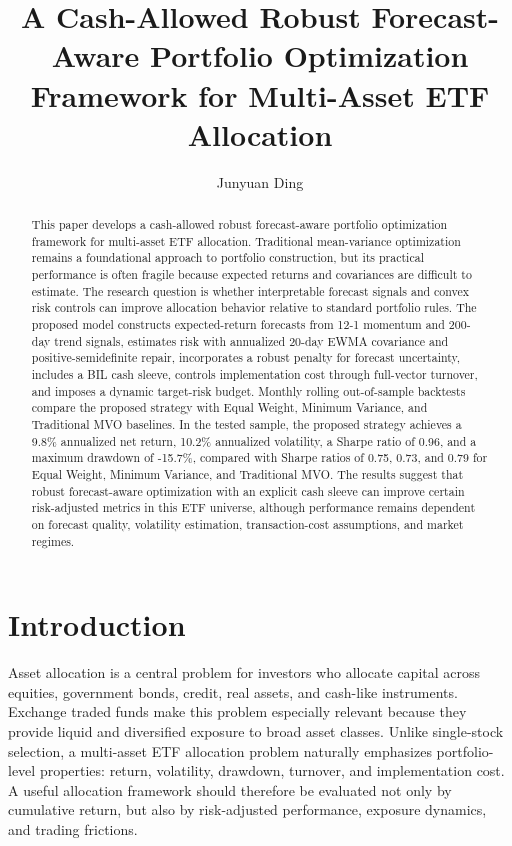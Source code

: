 \documentclass[11pt]{article}
\title{A Cash-Allowed Robust Forecast-Aware Portfolio Optimization Framework for Multi-Asset ETF Allocation}
\author{Junyuan Ding}
\date{}
\begin{document}
\maketitle

\begin{abstract}
This paper develops a cash-allowed robust forecast-aware portfolio optimization
framework for multi-asset ETF allocation. Traditional mean-variance optimization
remains a foundational approach to portfolio construction, but its practical
performance is often fragile because expected returns and covariances are difficult
to estimate. The research question is whether interpretable forecast signals and
convex risk controls can improve allocation behavior relative to standard portfolio
rules. The proposed model constructs expected-return forecasts from 12-1 momentum
and 200-day trend signals, estimates risk with annualized 20-day EWMA covariance
and positive-semidefinite repair, incorporates a robust penalty for forecast
uncertainty, includes a BIL cash sleeve, controls implementation cost through
full-vector turnover, and imposes a dynamic target-risk budget. Monthly rolling
out-of-sample backtests compare the proposed strategy with Equal Weight, Minimum
Variance, and Traditional MVO baselines. In the tested sample, the proposed strategy
achieves a 9.8\% annualized net return, 10.2\% annualized volatility, a Sharpe ratio
of 0.96, and a maximum drawdown of -15.7\%, compared with Sharpe ratios of 0.75,
0.73, and 0.79 for Equal Weight, Minimum Variance, and Traditional MVO. The results
suggest that robust forecast-aware optimization with an explicit cash sleeve can
improve certain risk-adjusted metrics in this ETF universe, although performance
remains dependent on forecast quality, volatility estimation, transaction-cost
assumptions, and market regimes.
\end{abstract}

\section{Introduction}

Asset allocation is a central problem for investors who allocate capital across
equities, government bonds, credit, real assets, and cash-like instruments. Exchange
traded funds make this problem especially relevant because they provide liquid and
diversified exposure to broad asset classes. Unlike single-stock selection, a
multi-asset ETF allocation problem naturally emphasizes portfolio-level properties:
return, volatility, drawdown, turnover, and implementation cost. A useful allocation
framework should therefore be evaluated not only by cumulative return, but also by
risk-adjusted performance, exposure dynamics, and trading frictions.
\end{document}
